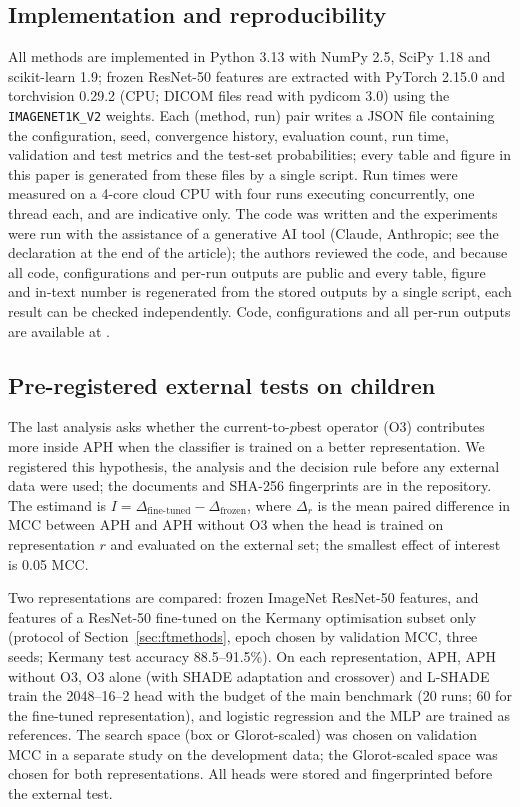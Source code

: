 \documentclass[preprint,12pt]{elsarticle}
\begin{document}
\subsection{Implementation and reproducibility}
All methods are implemented in Python 3.13 with NumPy 2.5, SciPy 1.18 and scikit-learn 1.9; frozen ResNet-50 features are extracted with PyTorch 2.15.0 and torchvision 0.29.2 (CPU; DICOM files read with pydicom 3.0) using the \texttt{IMAGENET1K\_V2} weights. Each (method, run) pair writes a JSON file containing the configuration, seed, convergence history, evaluation count, run time, validation and test metrics and the test-set probabilities; every table and figure in this paper is generated from these files by a single script. Run times were measured on a 4-core cloud CPU with four runs executing concurrently, one thread each, and are indicative only. The code was written and the experiments were run with the assistance of a generative AI tool (Claude, Anthropic; see the declaration at the end of the article); the authors reviewed the code, and because all code, configurations and per-run outputs are public and every table, figure and in-text number is regenerated from the stored outputs by a single script, each result can be checked independently. Code, configurations and all per-run outputs are available at \citet{alsbakhi2026code}.

\subsection{Pre-registered external tests on children}\label{sec:extmethods}
The last analysis asks whether the current-to-$p$best operator (O3) contributes more inside APH when the classifier is trained on a better representation. We registered this hypothesis, the analysis and the decision rule before any external data were used; the documents and SHA-256 fingerprints are in the repository. The estimand is $I=\Delta_{\mathrm{fine\text{-}tuned}}-\Delta_{\mathrm{frozen}}$, where $\Delta_r$ is the mean paired difference in MCC between APH and APH without O3 when the head is trained on representation $r$ and evaluated on the external set; the smallest effect of interest is 0.05 MCC.

Two representations are compared: frozen ImageNet ResNet-50 features, and features of a ResNet-50 fine-tuned on the Kermany optimisation subset only (protocol of Section~\ref{sec:ftmethods}, epoch chosen by validation MCC, three seeds; Kermany test accuracy 88.5--91.5\%). On each representation, APH, APH without O3, O3 alone (with SHADE adaptation and crossover) and L-SHADE train the 2048--16--2 head with the budget of the main benchmark (20 runs; 60 for the fine-tuned representation), and logistic regression and the MLP are trained as references. The search space (box or Glorot-scaled) was chosen on validation MCC in a separate study on the development data; the Glorot-scaled space was chosen for both representations. All heads were stored and fingerprinted before the external test.
\end{document}
